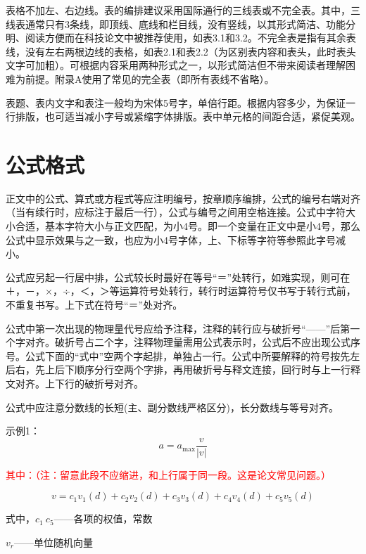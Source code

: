 表格不加左、右边线。表的编排建议采用国际通行的三线表或不完全表。其中，三线表通常只有3条线，即顶线、底线和栏目线，没有竖线，以其形式简洁、功能分明、阅读方便而在科技论文中被推荐使用，如表3.1和3.2。不完全表是指有其余表线，没有左右两根边线的表格，如表2.1和表2.2（为区别表内容和表头，此时表头文字可加粗）。可根据内容采用两种形式之一，以形式简洁但不带来阅读者理解困难为前提。附录A使用了常见的完全表（即所有表线不省略）。

表题、表内文字和表注一般均为宋体5号字，单倍行距。根据内容多少，为保证一行排版，也可适当减小字号或紧缩字体排版。表中单元格的间距合适，紧促美观。

\section{公式格式}
正文中的公式、算式或方程式等应注明编号，按章顺序编排，公式的编号右端对齐（当有续行时，应标注于最后一行），公式与编号之间用空格连接。公式中字符大小合适，基本字符大小与正文匹配，为小4号。即一个变量在正文中是小4号，那么公式中显示效果与之一致，也应为小4号字体，上、下标等字符等参照此字号减小。

公式应另起一行居中排，公式较长时最好在等号“＝”处转行，如难实现，则可在＋，－，×，÷，＜，＞等运算符号处转行，转行时运算符号仅书写于转行式前，不重复书写。上下式在符号“＝”处对齐。

公式中第一次出现的物理量代号应给予注释，注释的转行应与破折号“——”后第一个字对齐。破折号占二个字，注释物理量需用公式表示时，公式后不应出现公式序号。公式下面的“式中”空两个字起排，单独占一行。公式中所要解释的符号按先左后右，先上后下顺序分行空两个字排，再用破折号与释文连接，回行时与上一行释文对齐。上下行的破折号对齐。

公式中应注意分数线的长短(主、副分数线严格区分)，长分数线与等号对齐。


示例1：
\begin{equation}
    \label{equ:3.1}
    a = {a_{\max }}\frac{v}{{\left| v \right|}} %
\end{equation}

\textcolor{red}{其中：（注：留意此段不应缩进，和上行属于同一段。这是论文常见问题。）}

\begin{equation}
v = {c_1}{v_1}(d) + {c_2}{v_2}(d) + {c_3}{v_3}(d) + {c_4}{v_4}(d) + {c_5}{v_5}(d) \label{gongshi3.2}
\end{equation}

式中，$ c_{1}~c_{5}$——各项的权值，常数

     \hspace*{1.1cm}  ${v_r}$——单位随机向量
     
